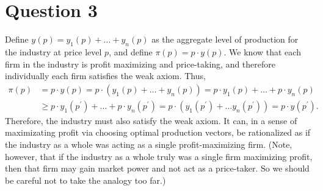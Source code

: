 \documentclass[11pt]{article} %
\begin{document}
\section{Question 3}
Define $y(p) = y_1(p) + \dots + y_n(p)$ as the aggregate level of production for the industry at price level $p$, and define $\pi (p) = p \cdot y(p)$. We know that each firm in the industry is profit maximizing and price-taking, and therefore individually each firm satisfies the weak axiom. Thus,
\begin{align*}
\pi (p) &= p \cdot y(p) = p \cdot (y_1(p) + \dots + y_n(p)) = p \cdot y_1(p) + \dots + p \cdot y_n(p) \\ &\geq p \cdot y_1(p^{'}) + \dots + p \cdot y_n(p^{'}) 
= p \cdot (y_1(p^{'}) + \dots y_n(p^{'})) = p \cdot y(p^{'}).
\end{align*}
Therefore, the industry must also satisfy the weak axiom. It can, in a sense of maximizating profit via choosing optimal production vectors, be rationalized as if the industry as a whole was acting as a single profit-maximizing firm. (Note, however, that if the industry as a whole truly was a single firm maximizing profit, then that firm may gain market power and not act as a price-taker. So we should be careful not to take the analogy too far.)

%
%
\end{document}

